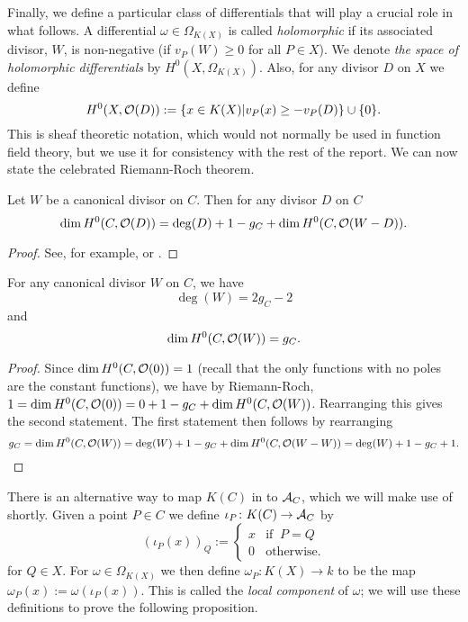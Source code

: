 Finally, we define a particular class of differentials that will play a crucial role in what follows.
A differential $\omega \in \Omega_{K(X)}$ is called {\em holomorphic} if its associated divisor, $W$, is non-negative (\ie if $v_P(W) \geq 0$ for all $P\in X$).
We denote {\em the space of holomorphic differentials} by $H^0(X,\Omega_{K(X)})$.
Also, for any divisor $D$ on $X$ we define 
    \[
    H^0(X,{\cal O}(D)) := \{x\in K(X) | v_P(x) \geq -v_P(D)\}\cup \{0\}.
    \]
This is sheaf theoretic notation, which would not normally be used in function field theory, but we use it for consistency with the rest of the report.
We can now state the celebrated Riemann-Roch theorem.

    \begin{thm}\label{riemannroch}
    Let $W$ be a canonical divisor on $C$.
    Then for any divisor $D$ on $C$ 
        \[
        \dim H^0(C,{\cal O}(D)) = \deg(D) + 1 - g_C + \dim H^0(C,{\cal O}(W-D)).
        \]
    \end{thm}
    \begin{proof}
    See, for example, \cite[8.6]{fulton} or \cite[Thm. 1.5.15]{stichtenoth}.
    \end{proof}


    \begin{cor}\label{dim=gc}
    For any canonical divisor $W$ on $C$, we have 
        \[
        \deg(W) = 2g_C-2
        \]
    and 
        \[
        \dim H^0(C,{\cal O}(W)) = g_C.
        \]
    \end{cor}
    \begin{proof}
    Since $\dim H^0(C,{\cal O}(0)) = 1$ (recall that the only functions with no poles are the constant functions), we have by Riemann-Roch, $ 1= \dim H^0(C,{\cal O}(0)) = 0 + 1 -g_C + \dim H^0(C,{\cal O}(W))$.
    Rearranging this gives the second statement.
    The first statement then follows by rearranging
        \[
        g_C = \dim H^0(C,{\cal O}(W)) = \deg(W) + 1 -g_C +  \dim H^0(C,{\cal O}(W-W))= \deg(W) + 1 -g_C + 1.
        \]
    \end{proof}


There is an alternative way to map $K(C)$ in to ${\mathcal A}_C$, which we will make use of shortly.
Given a point $P\in C$ we define $\iota_P\colon K(C) \rightarrow {\mathcal A}_C$ by
    \begin{equation}
    (\iota_P(x))_Q:= 
        \begin{cases}
        x & \text{if }\ P=Q\\
        0 & \text{otherwise}.
        \end{cases}
    \end{equation}
for $Q\in X$.
For $\omega \in \Omega_{K(X)}$ we then define $\omega_P\colon K(X) \rightarrow k$ to be the map $\omega_P(x) := \omega(\iota_P(x))$.
This is called the {\em local component} of $\omega$; we will use these definitions to prove the following proposition.

